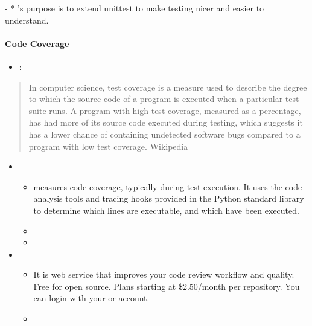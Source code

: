 \documentclass[letterpaper,10pt,english]{sphinxmanual}
\begin{document}
- * ’s purpose
is to extend unittest to make testing nicer and easier to understand.


\paragraph{Code Coverage}
\label{\detokenize{resource/programing/python_write_your_project:code-coverage}}\begin{itemize}
\item {} 
:

\end{itemize}
\begin{quote}

In computer science, test coverage is a measure used to describe the
degree to which the source code of a program is executed when a
particular test suite runs. A program with high test coverage,
measured as a percentage, has had more of its source code executed
during testing, which suggests it has a lower chance of containing
undetected software bugs compared to a program with low test
coverage. \textendash{} Wikipedia
\end{quote}
\begin{itemize}
\item {} 
\begin{itemize}
\item {} 
 measures code coverage, typically during test
execution. It uses the code analysis tools and tracing hooks
provided in the Python standard library to determine which lines
are executable, and which have been executed.

\item {} 

\item {} 

\end{itemize}

\item {} 
\begin{itemize}
\item {} 
It is web service that improves your code review workflow and
quality. Free for open source. Plans starting at \$2.50/month per
repository. You can login with your  or 
account.

\item {} 

\end{itemize}

\end{itemize}
\end{document}
